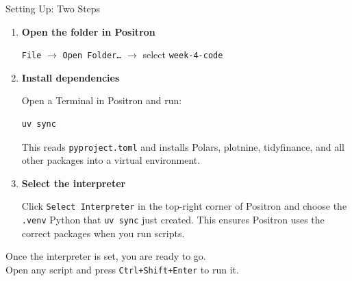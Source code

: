 \documentclass[9pt,aspectratio=169]{beamer}
\begin{document}
\begin{frame}[fragile]{Setting Up: Two Steps}

\begin{enumerate}
    \item \textbf{Open the folder in Positron}

    \smallskip

    \texttt{File} $\to$ \texttt{Open Folder\ldots} $\to$ select \texttt{week-4-code}

    \bigskip

    \item \textbf{Install dependencies}

    \smallskip

    Open a Terminal in Positron and run:

\begin{lstlisting}[basicstyle=\ttfamily\small]
uv sync
\end{lstlisting}

    This reads \texttt{pyproject.toml} and installs Polars, plotnine, tidyfinance, and all other packages into a virtual environment.

    \bigskip

    \item \textbf{Select the interpreter}

    \smallskip

    Click \texttt{Select Interpreter} in the top-right corner of Positron and choose the \texttt{.venv} Python that \texttt{uv sync} just created. This ensures Positron uses the correct packages when you run scripts.
\end{enumerate}

\bigskip

\begin{highlightbox}
\centering
Once the interpreter is set, you are ready to go.\\
Open any script and press \texttt{Ctrl+Shift+Enter} to run it.
\end{highlightbox}

\end{frame}
\end{document}
